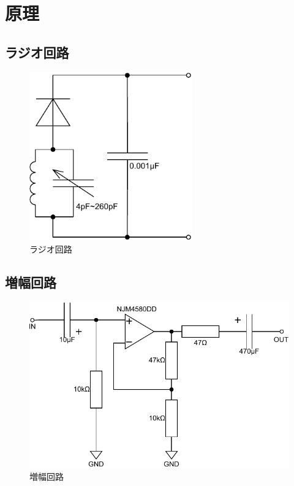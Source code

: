 \documentclass[report.tex]{subfiles}
\begin{document}
\section{原理}


\subsection{ラジオ回路}

\begin{figure}[H]
	\centering
	\includegraphics[width=7cm]{fig/radio.pdf}
	\caption{ラジオ回路}
	\label{fig:radio-circuit}
\end{figure}

\subsection{増幅回路}

\begin{figure}[H]
	\centering
	\includegraphics[width=13cm]{fig/amp.pdf}
	\caption{増幅回路}
	\label{fig:amplifier-circuit}
\end{figure}
\end{document}
